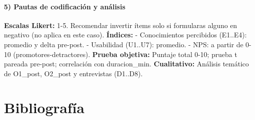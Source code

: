 \documentclass[12pt,oneside]{templates/unerthesis}
\begin{document}
\hypertarget{pautas-de-codificaciuxf3n-y-anuxe1lisis}{%
\subsubsection{5) Pautas de codificación y análisis}\label{pautas-de-codificaciuxf3n-y-anuxe1lisis}}

\textbf{Escalas Likert:} 1-5. Recomendar invertir ítems solo si formularas alguno en negativo (no aplica en este caso).
\textbf{Índices:}
- Conocimientos percibidos (E1..E4): promedio y delta pre-post.
- Usabilidad (U1..U7): promedio.
- NPS: a partir de 0-10 (promotores-detractores).
\textbf{Prueba objetiva:} Puntaje total 0-10; prueba t pareada pre-post; correlación con duracion\_min.
\textbf{Cualitativo:} Análisis temático de O1\_post, O2\_post y entrevistas (D1..D8).

\hypertarget{Biblio}{%
\chapter{Bibliografía}\label{Biblio}}
\end{document}
